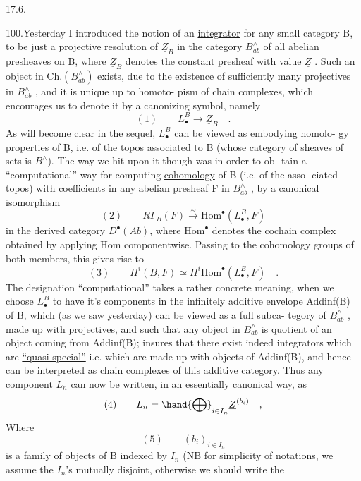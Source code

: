 
17.6.

100.\quad Yesterday I introduced the notion of an \uline{integrator} for any small
category B, to be just a projective resolution of $\underline{Z}_B$ in the category $B^{\wedge}_{ab}$
of all abelian presheaves on B, where $\underline{Z}_B$ denotes the constant presheaf
with value $\underline{Z}$ . Such an object in Ch.$(B^{\wedge}_{ab})$ exists, due to the existence
of sufficiently many projectives in $B^{\wedge}_{ab}$ , and it is unique up to homoto-%
pism of  chain complexes, which encourages us to denote it by a canonizing
symbol, namely
\[ (1) \qquad L^{B}_{\bullet} \to \underline{Z}_B \quad . \]
As will become clear in the sequel, $L^{B}_{\bullet}$ can be viewed as embodying \uline{homolo-%
gy properties} of B, i.e. of the topos associated to B (whose category of
sheaves of sets is $B^{\wedge}$). The way we hit upon it though was in order to ob-%
tain a ``computational'' way for computing \uline{cohomology} of B (i.e. of the asso-%
ciated topos) with coefficients in any abelian  presheaf F in $B^{\wedge}_{ab}$ ,
by a canonical isomorphism
\[ (2) \qquad R\Gamma_B(F) \xrightarrow{\sim} \mathrm{Hom}^{\bullet}(L^{B}_{\bullet}, F) \]
in the derived category $D^{\bullet}(Ab)$, where $\mathrm{Hom}^{\bullet}$ denotes the cochain complex
obtained by applying Hom componentwise. Passing to the cohomology groups
of both members, this gives rise to
\[ (3) \qquad H^{i}(B,F) \simeq H^{i}\mathrm{Hom}^{\bullet}(L^{B}_{\bullet} , F) \quad . \]
The designation ``computational'' takes a rather concrete meaning, when we
choose $L^{B}_{\bullet}$ to have it's components in the infinitely additive envelope
Addinf(B) of B, which (as we saw yesterday) can be viewed as a full subca-%
tegory of $B^{\wedge}_{ab}$ , made up with projectives, and such that any object in
$B^{\wedge}_{ab}$ is quotient of an object coming from Addinf(B);   insures that
there exist indeed integrators which are \uline{``quasi-special''} i.e. which are
made up with objects of Addinf(B), and hence can be interpreted as chain
complexes of this additive category. Thus any component $L_n$ can now be
written, in an essentially canonical way, as
\[ (4) \qquad L_n = \hand{\bigoplus}_{i\in I_n} \underline{Z}^{(b_i)} \quad , \]
Where
\[ (5) \qquad (b_i)_{i\in I_n} \]
is a family of objects of B indexed by $I_n$ (NB for simplicity of notations,
we assume the $I_n$'s mutually disjoint, otherwise we should write the
